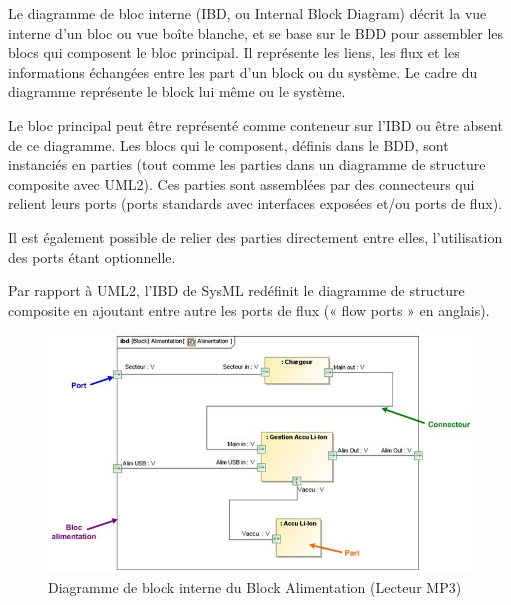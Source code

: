 \documentclass[12pt,a4paper]{report}
\begin{document}
\noindent \begin{flushleft}
	Le diagramme de bloc interne (IBD, ou Internal Block Diagram) d\'{e}crit la vue interne d'un bloc ou vue bo\^{i}te blanche, et se base sur le BDD pour assembler les blocs qui composent le bloc principal. Il repr\'{e}sente les liens, les flux et les informations \'{e}chang\'{e}es entre les part d'un block ou du syst\`{e}me. Le cadre du diagramme repr\'{e}sente le block lui m\^{e}me ou le syst\`{e}me.
	
	\noindent Le bloc principal peut \^{e}tre repr\'{e}sent\'{e} comme conteneur sur l'IBD ou \^{e}tre absent de ce diagramme. Les blocs qui le composent, d\'{e}finis dans le BDD, sont instanci\'{e}s en parties (tout comme les parties dans un diagramme de structure composite avec UML2). Ces parties sont assembl\'{e}es par des connecteurs qui relient leurs ports (ports standards avec interfaces expos\'{e}es et/ou ports de flux).
	
	\noindent Il est \'{e}galement possible de relier des parties directement entre elles, l'utilisation des ports \'{e}tant optionnelle.
	
	\noindent Par rapport \`{a} UML2, l'IBD de SysML red\'{e}finit le diagramme de structure composite en ajoutant entre autre les ports de flux (« flow ports » en anglais). 
	
\end{flushleft}
\begin{figure}[H]
	\centering
	\includegraphics[width=0.8\linewidth]{image13.png}
	\caption{Diagramme de block interne du Block Alimentation (Lecteur MP3)}
	
\end{figure}
\end{document}
